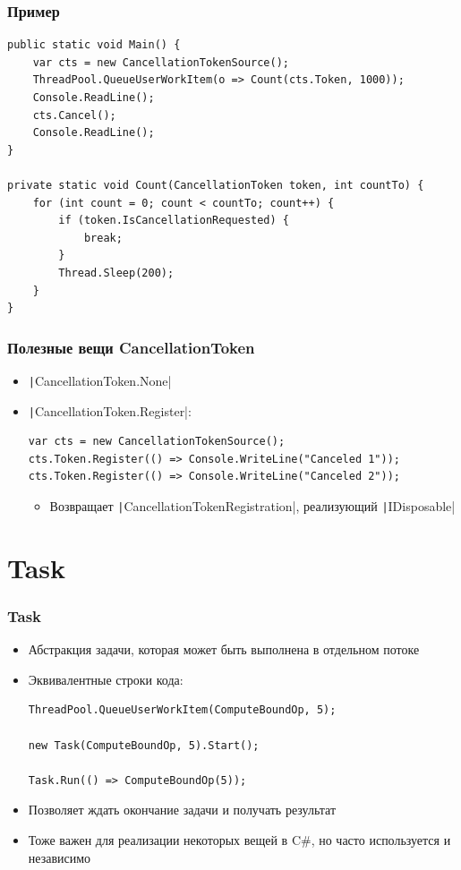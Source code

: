 \documentclass[xetex,mathserif,serif]{beamer}
\begin{document}
	\begin{frame}[fragile]
		\frametitle{Пример}
		\begin{small}
			\begin{verbatim}
public static void Main() {
    var cts = new CancellationTokenSource();
    ThreadPool.QueueUserWorkItem(o => Count(cts.Token, 1000));
    Console.ReadLine();
    cts.Cancel();
    Console.ReadLine();
}

private static void Count(CancellationToken token, int countTo) {
    for (int count = 0; count < countTo; count++) {
        if (token.IsCancellationRequested) {
            break;
        }
        Thread.Sleep(200); 
    }
}
			\end{verbatim}
		\end{small}
	\end{frame}

	\begin{frame}[fragile]
		\frametitle{Полезные вещи CancellationToken}
		\begin{itemize}
			\item \texttt|CancellationToken.None|
			\item \texttt|CancellationToken.Register|:
				\begin{verbatim}
var cts = new CancellationTokenSource();
cts.Token.Register(() => Console.WriteLine("Canceled 1"));
cts.Token.Register(() => Console.WriteLine("Canceled 2"));
				\end{verbatim}
				\begin{itemize}
					\item Возвращает \texttt|CancellationTokenRegistration|, реализующий \texttt|IDisposable|
				\end{itemize}
		\end{itemize}
	\end{frame}

	\section{Task}

	\begin{frame}[fragile]
		\frametitle{Task}
		\begin{itemize}
			\item Абстракция задачи, которая может быть выполнена в отдельном потоке
			\item Эквивалентные строки кода:
				\begin{verbatim}
ThreadPool.QueueUserWorkItem(ComputeBoundOp, 5);

new Task(ComputeBoundOp, 5).Start();

Task.Run(() => ComputeBoundOp(5));
				\end{verbatim}
			\item Позволяет ждать окончание задачи и получать результат
			\item Тоже важен для реализации некоторых вещей в C\#, но часто используется и независимо
		\end{itemize}
	\end{frame}
\end{document}
